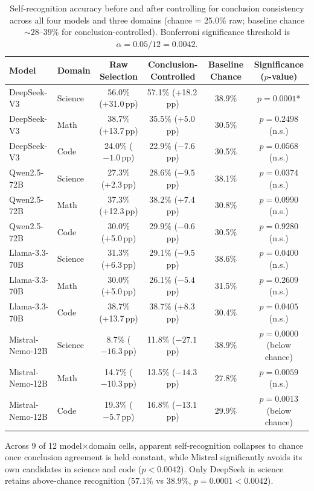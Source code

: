 \begin{table}[H]
\centering
\small
\caption{Self-recognition accuracy before and after controlling for conclusion consistency across all four models and three domains (chance = 25.0\% raw; baseline chance $\sim 28\text{--}39\%$ for conclusion-controlled). Bonferroni significance threshold is $\alpha = 0.05/12 = 0.0042$.}
\label{tab:self-rec-full}
\begin{tabular}{llcccc}
\toprule
\bf Model & \bf Domain & \bf Raw Selection & \bf Conclusion-Controlled & \bf Baseline Chance & \bf Significance ($p$-value) \\
\midrule
DeepSeek-V3 & Science & 56.0\% (+31.0\,pp) & 57.1\% (+18.2\,pp) & 38.9\% & $p = 0.0001$* \\
DeepSeek-V3 & Math    & 38.7\% (+13.7\,pp) & 35.5\% (+5.0\,pp)  & 30.5\% & $p = 0.2498$ (n.s.) \\
DeepSeek-V3 & Code    & 24.0\% ($-1.0$\,pp)  & 22.9\% ($-7.6$\,pp)  & 30.5\% & $p = 0.0568$ (n.s.) \\
\midrule
Qwen2.5-72B & Science & 27.3\% (+2.3\,pp)  & 28.6\% ($-9.5$\,pp)  & 38.1\% & $p = 0.0374$ (n.s.) \\
Qwen2.5-72B & Math    & 37.3\% (+12.3\,pp) & 38.2\% (+7.4\,pp)  & 30.8\% & $p = 0.0990$ (n.s.) \\
Qwen2.5-72B & Code    & 30.0\% (+5.0\,pp)  & 29.9\% ($-0.6$\,pp)  & 30.5\% & $p = 0.9280$ (n.s.) \\
\midrule
Llama-3.3-70B & Science & 31.3\% (+6.3\,pp)  & 29.1\% ($-9.5$\,pp)  & 38.6\% & $p = 0.0400$ (n.s.) \\
Llama-3.3-70B & Math    & 30.0\% (+5.0\,pp)  & 26.1\% ($-5.4$\,pp)  & 31.5\% & $p = 0.2609$ (n.s.) \\
Llama-3.3-70B & Code    & 38.7\% (+13.7\,pp) & 38.7\% (+8.3\,pp)  & 30.4\% & $p = 0.0405$ (n.s.) \\
\midrule
Mistral-Nemo-12B & Science & 8.7\% ($-16.3$\,pp) & 11.8\% ($-27.1$\,pp) & 38.9\% & $p = 0.0000$ (below chance) \\
Mistral-Nemo-12B & Math    & 14.7\% ($-10.3$\,pp) & 13.5\% ($-14.3$\,pp) & 27.8\% & $p = 0.0059$ (n.s.) \\
Mistral-Nemo-12B & Code    & 19.3\% ($-5.7$\,pp)  & 16.8\% ($-13.1$\,pp) & 29.9\% & $p = 0.0013$ (below chance) \\
\bottomrule
\end{tabular}
\end{table}
Across 9 of 12 model$\times$domain cells, apparent self-recognition collapses to chance once conclusion agreement is held constant, while Mistral significantly avoids its own candidates in science and code ($p < 0.0042$). Only DeepSeek in science retains above-chance recognition ($57.1\%$ vs $38.9\%$, $p = 0.0001 < 0.0042$).

